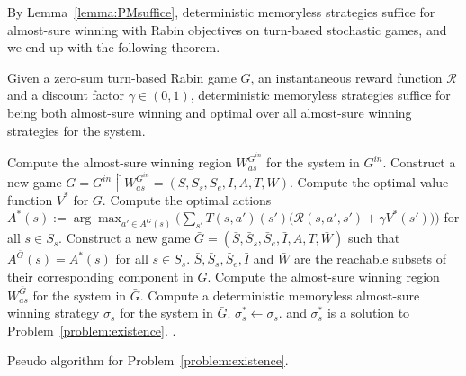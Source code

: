 \documentclass[runningheads,a4paper]{llncs}
\begin{document}
By Lemma~\ref{lemma:PMsuffice}, deterministic memoryless strategies suffice for almost-sure winning with Rabin objectives on turn-based stochastic games, and we end up with the following theorem. 

\begin{theorem}
Given a zero-sum turn-based Rabin game $G$, an instantaneous reward function $\mathcal{R}$ and a discount factor $\gamma \in (0,1)$, 
deterministic memoryless strategies suffice for being both almost-sure winning and optimal over all almost-sure winning strategies for the system. 
\label{thm:optimalsufficiency}
\end{theorem}
 




\begin{algorithm}[!t]
\begin{algorithmic}[1]
    \State Compute the almost-sure winning region $W_{as}^{G^{in}}$ for the system in $G^{in}$. \State Construct a new game $G = G^{in} \upharpoonright W_{as}^{G^{in}} = (S, S_s, S_e, I, A, T, W)$. 
    \State Compute the optimal value function $V^*$ for $G$. 
    \State Compute the optimal actions $A^*(s) := \arg\max_{a' \in A^G(s)} \Big( \sum_{s'} T(s, a')(s') \big( \mathcal{R}(s,a',s') + \gamma V^*(s') \big) \Big)$ for all $s \in S_s$.
\State Construct a new game $\bar{G} = (\bar{S}, \bar{S}_s, \bar{S}_e, \bar{I}, A, T, \bar{W})$ such that $A^{\bar{G}}(s) = A^*(s)$ for all $s \in S_s$. $\bar{S}, \bar{S}_s, \bar{S}_e, \bar{I}$ and $\bar{W}$ are the reachable subsets of their corresponding component in $G$.
\State Compute the almost-sure winning region ${W}_{as}^{\bar{G}}$ for the system in $\bar{G}$.  
    		\State Compute a deterministic memoryless almost-sure winning strategy $\sigma_s$ for the system in $\bar{G}$. $\sigma^*_s \gets \sigma_s$.
        \State \Return \True and $\sigma^*_s$ is a solution to Problem~\ref{problem:existence}.
\Else
    		\State \Return \False.
\EndIf
\end{algorithmic}
\caption{Pseudo algorithm for Problem~\ref{problem:existence}.}
\label{alg:p1}
\end{algorithm}
\end{document}
